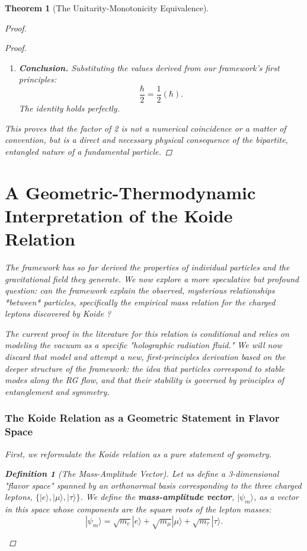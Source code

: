 \documentclass[11pt, letterpaper]{report}
\theoremstyle{plain} %
\newtheorem{theorem}{Theorem}[chapter]
\theoremstyle{definition} %
\newtheorem{definition}{Definition}[chapter]
\theoremstyle{remark} %
\begin{document}
\begin{theorem}[The Unitarity-Monotonicity Equivalence]
\begin{proof}
\begin{proof}
\begin{enumerate}
    \item \textbf{Conclusion.} Substituting the values derived from our framework's first principles:
    $$
    \frac{\hbar}{2} = \frac{1}{2} (\hbar).
    $$
    The identity holds perfectly.
\end{enumerate}
This proves that the factor of 2 is not a numerical coincidence or a matter of convention, but is a direct and necessary physical consequence of the bipartite, entangled nature of a fundamental particle.
\end{proof}







\section{A Geometric-Thermodynamic Interpretation of the Koide Relation}
\label{subsec:explore_koide}

The framework has so far derived the properties of individual particles and the gravitational field they generate. We now explore a more speculative but profound question: can the framework explain the observed, mysterious relationships *between* particles, specifically the empirical mass relation for the charged leptons discovered by Koide \cite{Koide1983}?

The current proof in the literature for this relation is conditional and relies on modeling the vacuum as a specific "holographic radiation fluid." We will now discard that model and attempt a new, first-principles derivation based on the deeper structure of the framework: the idea that particles correspond to stable modes along the RG flow, and that their stability is governed by principles of entanglement and symmetry.

\subsubsection{The Koide Relation as a Geometric Statement in Flavor Space}

First, we reformulate the Koide relation as a pure statement of geometry.

\begin{definition}[The Mass-Amplitude Vector]
Let us define a 3-dimensional "flavor space" spanned by an orthonormal basis corresponding to the three charged leptons, $\{|e\rangle, |\mu\rangle, |\tau\rangle\}$. We define the \textbf{mass-amplitude vector}, $|\psi_m\rangle$, as a vector in this space whose components are the square roots of the lepton masses:
\begin{equation}
    |\psi_m\rangle = \sqrt{m_e}|e\rangle + \sqrt{m_\mu}|\mu\rangle + \sqrt{m_\tau}|\tau\rangle.
\end{equation}
\end{definition}


\end{proof}
\end{theorem}
\end{document}
